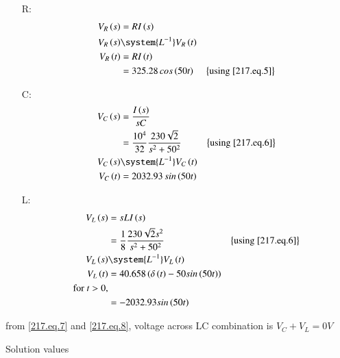 \documentclass[journal,12pt,twocolumn]{IEEEtran}
\begin{document}
\begin{enumerate}
    \item[R: ]
    \begin{align}
    V_R\brak{s} & = RI\brak{s}\\
    V_R\brak{s} & \system{L^{-1}} V_R\brak{t}\\
    V_R\brak{t} & = RI\brak{t}\\
    & = 325.28 \, cos\brak{50 t} &\cbrak{\text{using \eqref{217.eq.5}}}\\
    \end{align}
    \item[C: ]
    \begin{align}
    V_C\brak{s} & = \frac{I\brak{s}}{sC}\\
    & = \frac{10^4}{32}\frac{230\sqrt{2}}{s^2 + 50^2} &\cbrak{\text{using \eqref{217.eq.6}}}\\
    V_C\brak{s} & \system{L^{-1}} V_C\brak{t}\\
    V_C\brak{t} & = 2032.93 \, sin\brak{50 t} \label{217.eq.7}
    \end{align}
    \item[L:] 
    \begin{align}
    V_L\brak{s} & = sLI\brak{s}\\
    & = \frac{1}{8}\frac{230\sqrt{2}s^2}{s^2 + 50^2} &\cbrak{\text{using \eqref{217.eq.6}}}\\
    V_L\brak{s} & \system{L^{-1}} V_L\brak{t}\\
    V_L\brak{t} & = 40.658 \brak{ \delta\brak{t} - 50sin\brak{50 t}}\\
    \text{for } t>0, \\
    & = -2032.93sin\brak{50 t} \label{217.eq.8}
    \end{align}
\end{enumerate}

from \eqref{217.eq.7} and \eqref{217.eq.8}, voltage across LC combination is $V_C + V_L = 0 V$
\begin{table}[h]
    \centering
    
    \caption{Solution values}
    \label{tab:217.tab.2}
\end{table}
\end{document}
